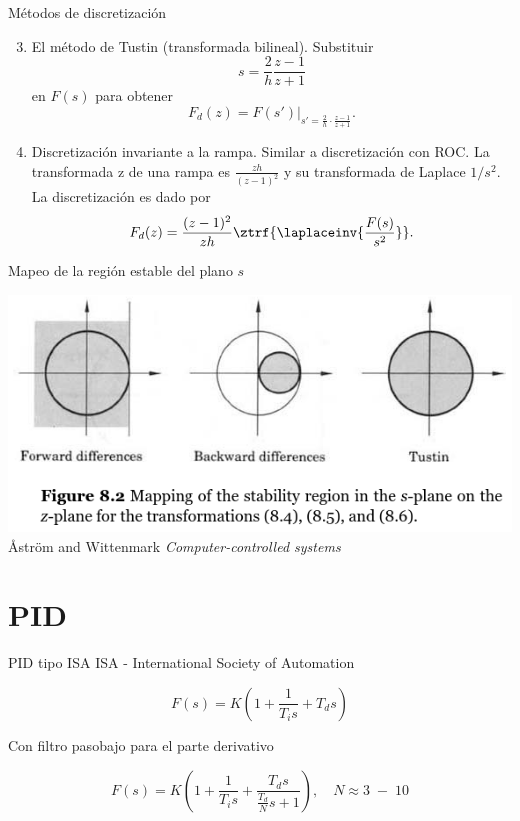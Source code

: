 \documentclass[presentation,aspectratio=1610]{beamer}
\begin{document}
\begin{frame}[label={sec:orgff9ce2f}]{Métodos de discretización}
\begin{enumerate}
\setcounter{enumi}{2}
\item El método de Tustin (transformada bilineal). Substituir
\[ s = \frac{2}{h}\frac{z-1}{z+1} \] en \(F(s)\) para obtener
\[ F_d(z) = F(s')|_{s'=\frac{2}{h}\cdot \frac{z-1}{z+1}}. \]
\item Discretización invariante a la rampa. Similar a discretización con ROC. La transformada z de una rampa es  \(\frac{zh}{(z-1)^2}\) y su transformada de Laplace \(1/s^2\). La discretización es dado por
\[ F_d(z) = \frac{(z-1)^2}{zh} \ztrf{\laplaceinv{\frac{F(s)}{s^2}}}. \]
\end{enumerate}
\end{frame}

\begin{frame}[label={sec:org8c29b43}]{Mapeo de la región estable del plano \(s\)}
\begin{center}
 \includegraphics[width=0.79\linewidth]{../../figures/fig8-2.png}\\
{\tiny Åström and Wittenmark \emph{Computer-controlled systems}}
\end{center}
\end{frame}

\section{PID}
\label{sec:orgb269cd2}
\begin{frame}[label={sec:org974df95}]{PID tipo ISA}
ISA - International Society of Automation

\[ F(s) = K\left( 1 + \frac{1}{T_i s} + T_d s\right) \]

Con filtro pasobajo para el parte derivativo

\[ F(s) = K\left( 1 + \frac{1}{T_i s} + \frac{T_d s}{\frac{T_d}{N} s + 1}\right), \quad N \approx 3\; - \; 10 \]
\end{frame}
\end{document}
